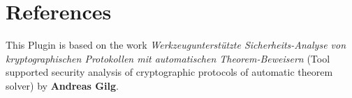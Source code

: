 \documentclass[12pt,journal,compsoc]{IEEEtran}
\newcommand{\MITMA}[0]{man-in-the-middle attacker }
\begin{document}
\section{References}

This Plugin is based on the work 
\textit{Werkzeugunterstützte Sicherheits-Analyse von kryptographischen Protokollen mit automatischen Theorem-Beweisern} 
(Tool supported security analysis of cryptographic protocols of automatic theorem solver) by \textbf{Andreas Gilg}.








	
\end{document}

